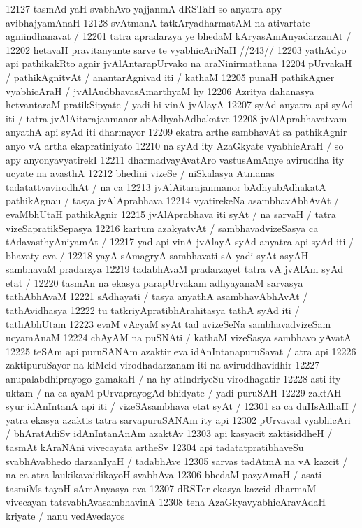 12127 tasmAd yaH svabhAvo yajjanmA dRSTaH so anyatra apy avibhajyamAnaH 
12128 svAtmanA tatkAryadharmatAM na ativartate agniindhanavat /
12201 	tatra apradarzya ye bhedaM kAryasAmAnyadarzanAt /  
12202 	hetavaH pravitanyante sarve te vyabhicAriNaH //243// 
12203 yathAdyo api pathikakRto agnir jvAlAntarapUrvako na araNinirmathana
12204 pUrvakaH / pathikAgnitvAt / anantarAgnivad iti / kathaM
12205 punaH pathikAgner vyabhicAraH / jvAlAudbhavasAmarthyaM hy
12206 Azritya dahanasya hetvantaraM pratikSipyate / yadi hi vinA jvAlayA
12207 syAd anyatra api syAd iti / tatra jvAlAitarajanmanor abAdhyabAdhakatve
12208 jvAlAprabhavatvam anyathA api syAd iti dharmayor  
12209 ekatra arthe sambhavAt sa pathikAgnir anyo vA artha ekapratiniyato
12210 na syAd ity AzaGkyate vyabhicAraH / so apy anyonyavyatirekI 
12211 dharmadvayAvatAro vastusAmAnye aviruddha ity ucyate na avasthA
12212 bhedini vizeSe / niSkalasya Atmanas tadatattvavirodhAt / na ca  
12213 jvAlAitarajanmanor bAdhyabAdhakatA pathikAgnau / tasya jvAlAprabhava
12214 vyatirekeNa asambhavAbhAvAt / evaMbhUtaH pathikAgnir
12215 jvAlAprabhava iti syAt / na sarvaH / tatra vizeSapratikSepasya 
12216 kartum azakyatvAt / sambhavadvizeSasya ca tAdavasthyAniyamAt /
12217 yad api vinA jvAlayA syAd anyatra api syAd iti / bhavaty eva / 
12218 yayA sAmagryA sambhavati sA yadi syAt asyAH sambhavaM pradarzya  
12219 tadabhAvaM pradarzayet tatra vA jvAlAm syAd etat /
12220 tasmAn na ekasya parapUrvakam adhyayanaM sarvasya tathAbhAvaM  
12221 sAdhayati / tasya anyathA asambhavAbhAvAt / tathAvidhasya 
12222 tu tatkriyApratibhArahitasya tathA syAd iti / tathAbhUtam  
12223 evaM vAcyaM syAt tad avizeSeNa sambhavadvizeSam ucyamAnaM 
12224 chAyAM na puSNAti / kathaM vizeSasya sambhavo yAvatA  
12225 teSAm api puruSANAm azaktir eva idAnIntanapuruSavat / atra api  
12226 zaktipuruSayor na kiMcid virodhadarzanam iti na aviruddhavidhir  
12227 anupalabdhiprayogo gamakaH / na hy atIndriyeSu virodhagatir
12228 asti ity uktam / na ca ayaM pUrvaprayogAd bhidyate / yadi puruSAH  
12229 zaktAH syur idAnIntanA api iti / vizeSAsambhava etat syAt /  
12301 sa ca duHsAdhaH / yatra ekasya azaktis tatra sarvapuruSANAm ity api
12302 pUrvavad vyabhicAri / bhAratAdiSv idAnIntanAnAm azaktAv  
12303 api kasyacit zaktisiddheH / tasmAt kAraNAni vivecayata artheSv  
12304 api tadatatpratibhaveSu svabhAvabhedo darzanIyaH / tadabhAve 
12305 sarvas tadAtmA na vA kazcit / na ca atra laukikavaidikayoH svabhAva 
12306 bhedaM pazyAmaH / asati tasmiMs tayoH sAmAnyasya eva 
12307 dRSTer ekasya kazcid dharmaM vivecayan tatsvabhAvasambhavinA 
12308 tena AzaGkyavyabhicAravAdaH kriyate / nanu vedAvedayos 
